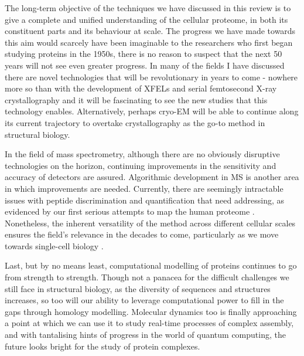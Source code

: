 \documentclass[a4paper,11pt,twoside,openright]{scrbook}
\begin{document}
The long-term objective of the techniques we have discussed in this review is to give a complete and unified understanding of the cellular proteome, in both its constituent parts and its behaviour at scale. The progress we have made towards this aim would scarcely have been imaginable to the researchers who first began studying proteins in the 1950s, there is no reason to suspect that the next 50 years will not see even greater progress. In many of the fields I have discussed there are novel technologies that will be revolutionary in years to come - nowhere more so than with the development of XFELs and serial femtosecond X-ray crystallography and it will be fascinating to see the new studies that this technology enables. Alternatively, perhaps cryo-EM will be able to continue along its current trajectory to overtake crystallography as the go-to method in structural biology.

In the field of mass spectrometry, although there are no obviously disruptive technologies on the horizon, continuing improvements in the sensitivity and accuracy of detectors are assured. Algorithmic development in MS is another area in which improvements are needed. Currently, there are seemingly intractable issues with peptide discrimination and quantification that need addressing, as evidenced by our first serious attempts to map the human proteome \cite{Kim2014,Wilhelm2014,Ezkurdia2014}. Nonetheless, the inherent versatility of the method across different cellular scales ensures the field's relevance in the decades to come, particularly as we move towards single-cell biology \cite{Macaulay2017}.

Last, but by no means least, computational modelling of proteins continues to go from strength to strength. Though not a panacea for the difficult challenges we still face in structural biology, as the diversity of sequences and structures increases, so too will our ability to leverage computational power to fill in the gaps through homology modelling. Molecular dynamics too is finally approaching a point at which we can use it to study real-time processes of complex assembly, and with tantalising hints of progress in the world of quantum computing, the future looks bright for the study of protein complexes.

\end{document}
